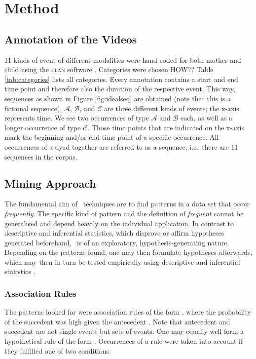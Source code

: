 
\chapter{Method}

\section{Annotation of the Videos}
11 kinds of event of different modalities were hand-coded for both mother and child using the \textsc{elan} software \cite{wittenburg06}. Categories were chosen HOW??  %
Table \ref{tab:categories} lists all categories. Every annotation contains a start and end time point and therefore also the duration of the respective event. This way, sequences as shown in Figure \ref{fig:idealseq} are obtained (note that this is a fictional sequence). \(\mathcal{A}\), \(\mathcal{B}\), and \(\mathcal{C}\) are three different kinds of events; the x-axis represents time. We see two occurrences of type \(\mathcal{A}\) and \(\mathcal{B}\) each, as well as a longer occurrence of type \(\mathcal{C}\). Those time points that are indicated on the x-axis mark the beginning and/or end time point of a specific occurrence. All occurrences of a dyad together are referred to as a sequence, i.e.~there are 11 sequences in the corpus.





\section{Mining Approach}
The fundamental aim of \fpm~techniques are to find patterns in a data set that occur \emph{frequently}. The specific kind of pattern and the definition of \emph{frequent} cannot be generalised and depend heavily on the individual application. In contrast to descriptive and inferential statistics, which disprove or affirm hypotheses generated beforehand, \fpm~is of an exploratory, hypothesis-generating nature. Depending on the patterns found, one may then formulate hypotheses afterwards, which may then in turn be tested empirically using descriptive and inferential statistics \cite[PAGEREFS]{rohlfing18,han12}.%

\subsection{Association Rules}
The patterns  looked for were association rules of the form , where the probability of the succedent  was high given the antecedent . Note that antecedent and succedent are not single events but sets of events. One may equally well form a hypothetical rule of the form . Occurrences of a rule were taken into account if they fulfilled one of two conditions:

